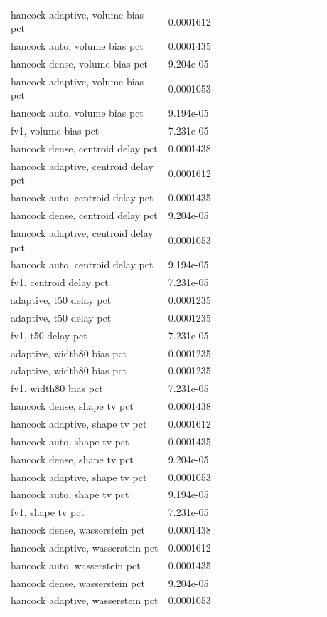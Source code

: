 \begin{longtable}{p{0.4400\linewidth}p{0.4400\linewidth}}
hancock adaptive, volume bias pct & 0.0001612 \\
hancock auto, volume bias pct & 0.0001435 \\
hancock dense, volume bias pct & 9.204e-05 \\
hancock adaptive, volume bias pct & 0.0001053 \\
hancock auto, volume bias pct & 9.194e-05 \\
fv1, volume bias pct & 7.231e-05 \\
hancock dense, centroid delay pct & 0.0001438 \\
hancock adaptive, centroid delay pct & 0.0001612 \\
hancock auto, centroid delay pct & 0.0001435 \\
hancock dense, centroid delay pct & 9.204e-05 \\
hancock adaptive, centroid delay pct & 0.0001053 \\
hancock auto, centroid delay pct & 9.194e-05 \\
fv1, centroid delay pct & 7.231e-05 \\
adaptive, t50 delay pct & 0.0001235 \\
adaptive, t50 delay pct & 0.0001235 \\
fv1, t50 delay pct & 7.231e-05 \\
adaptive, width80 bias pct & 0.0001235 \\
adaptive, width80 bias pct & 0.0001235 \\
fv1, width80 bias pct & 7.231e-05 \\
hancock dense, shape tv pct & 0.0001438 \\
hancock adaptive, shape tv pct & 0.0001612 \\
hancock auto, shape tv pct & 0.0001435 \\
hancock dense, shape tv pct & 9.204e-05 \\
hancock adaptive, shape tv pct & 0.0001053 \\
hancock auto, shape tv pct & 9.194e-05 \\
fv1, shape tv pct & 7.231e-05 \\
hancock dense, wasserstein pct & 0.0001438 \\
hancock adaptive, wasserstein pct & 0.0001612 \\
hancock auto, wasserstein pct & 0.0001435 \\
hancock dense, wasserstein pct & 9.204e-05 \\
hancock adaptive, wasserstein pct & 0.0001053 \\

\end{longtable}
